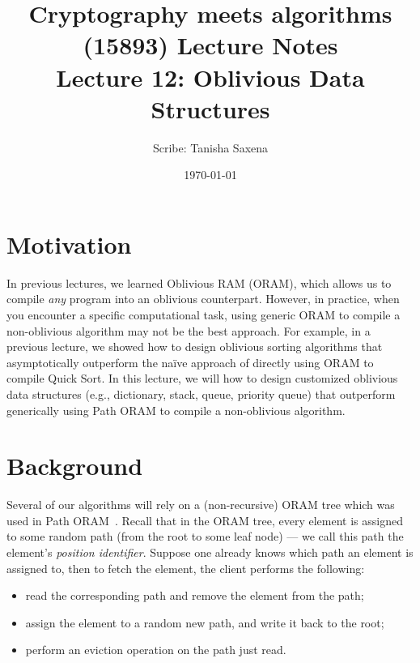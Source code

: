 \documentclass[11pt]{article}
\title{{\Large Cryptography meets algorithms (15893) Lecture Notes}\\[5pt]
{\bf Lecture 12: Oblivious Data Structures}}
\author{Scribe: Tanisha Saxena}
\date{\today}
\begin{document}
\maketitle

\section{Motivation}
In previous lectures, we learned Oblivious RAM (ORAM),
which allows us to 
compile {\it any} program into an oblivious counterpart. 
However, in practice, when you encounter
a specific computational task, using generic ORAM  
to compile a non-oblivious algorithm may not 
be the best approach. 
For example, in a previous lecture, 
we showed how to design oblivious  
sorting algorithms that asymptotically outperform
the na\"ive approach of directly using ORAM
to compile Quick Sort. 
In this lecture, we will how to design
customized oblivious data structures 
(e.g., dictionary, stack, queue, priority queue) 
that outperform 
generically using Path ORAM to compile a non-oblivious algorithm.



\section{Background}
Several of our algorithms will rely on a (non-recursive) ORAM tree
 which was used in Path ORAM~\cite{stefanov2018path}.  
Recall that in the ORAM tree, every element is assigned
to some random path (from the root to some leaf node) --- 
we call this path the  
element's {\it position identifier}.
Suppose one already knows which path an element 
is assigned to, then to fetch the element,
the client performs the following:
\begin{itemize}
\item 
read the corresponding path  
and remove the element 
from the path;
\item 
assign the element to a random new path,
and write it back to the root;
\item 
perform an eviction operation 
on the path just read. 
\end{itemize}
\end{document}
